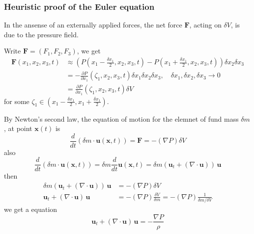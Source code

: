 \subsubsection{Heuristic proof of the Euler equation} %

In the ansense of an externally applied forces, the net force $\textbf{F}$, acting on $\delta V$, is due to the pressure field.

Write $\textbf{F}=(F_1,F_2,F_3)$, we get
\begin{equation}
\begin{aligned}
\textbf{F}(x_1,x_2,x_3,t)
&\approx \left(
P\left(x_1-\frac{\delta x_1}{2},x_2,x_3,t\right)
- P\left(x_1+\frac{\delta x_1}{2},x_2,x_3,t\right)
\right)\delta x_2 \delta x_3\\
&= -\frac{\partial P}{\partial x_1}(\zeta_{1},x_2,x_3, t)\delta x_1 \delta x_2 \delta x_3,\quad \delta x_1, \delta x_2, \delta x_3\to 0\\
&= \frac{\partial P}{\partial x_1}(\zeta_{1},x_2,x_3, t)\delta V
\end{aligned}
\end{equation}
for some $\zeta_1\in\left(x_1-\frac{\delta x_1}{2}, x_1+\frac{\delta x_1}{2}\right)$.

By Newton's second law, the equation of motion for the elemnet of fund mass $\delta m$, at point $\textbf{x}(t)$ is 
\begin{equation}
\frac{d}{dt}\left(\delta m \cdot \textbf{u}(\textbf{x},t)\right) = \textbf{F} = -(\nabla P)\delta V
\end{equation}
also
\begin{equation}
\frac{d}{dt}\left(\delta m \cdot \textbf{u}(\textbf{x},t)\right) = \delta m \frac{d}{dt}\textbf{u}(\textbf{x},t) = \delta m \left(\textbf{u}_t+(\nabla\cdot \textbf{u})\right)\,\textbf{u}
\end{equation}
then
\begin{equation}
\begin{aligned}
\delta m \left(\textbf{u}_t+(\nabla\cdot \textbf{u})\right) \,\textbf{u}
&=
-(\nabla P)\delta V\\
\textbf{u}_t+ (\nabla\cdot \textbf{u})\,\textbf{u} &= -(\nabla P)\frac{\delta V}{\delta m} = -(\nabla P)\frac{1}{\delta m/\delta V}
\end{aligned}
\end{equation}
we get a equation
\begin{equation}
\textbf{u}_t+ (\nabla\cdot \textbf{u}) \,\textbf{u} = -\frac{\nabla P}{\rho}
\end{equation}


